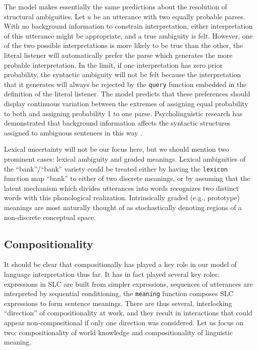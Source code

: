 \documentclass[pdfextras]{handbook}
\begin{document}
The model makes essentially the same predictions about the resolution of structural ambiguities. Let $u$ be an utterance with two equally probable parses.
With no background information to constrain interpretation, either interpretation of this utterance might be appropriate, and a true ambiguity is felt. 
However, one of the two possible interpretations is more likely to be true than the other, the literal listener will automatically prefer the parse which generates the more probable interpretation.
In the limit, if one interpretation has zero prior probability, the syntactic ambiguity will not be felt because the interpretation that it generates will always be rejected by the \lstinline{query} function embedded in the definition of the literal listener.
The model predicts that these preferences should display continuous variation between the extremes of assigning equal probability to both and assigning probability 1 to one parse.
Psycholinguistic research has demonstrated that background information affects the syntactic structures assigned to ambiguous sentences in this way \citep{crain1985not,altmann1988interaction,spivey2002eye}.

Lexical uncertainty will not be our focus here, but we should mention two prominent cases: lexical ambiguity and graded meanings. 
Lexical ambiguities of the ``bank''/``bank'' variety could be treated either by having the \lstinline{lexicon} function map ``bank'' to either of two discrete meanings, or by assuming that the latent mechanism which divides utterances into words recognizes two distinct words with this phonological realization.
Intrinsically graded (e.g., prototype) meanings are most naturally thought of as stochastically denoting regions of a non-discrete conceptual space. 


\subsection{Compositionality}

It should be clear that compositionally has played a key role in our model of language interpretation thus far. It has in fact played several key roles: expressions in SLC are built from simpler expressions, sequences of utterances are interpreted by sequential conditioning, the \lstinline{meaning} function composes SLC expressions to form sentence meanings. There are thus several, interlocking ``direction'' of compositionality at work, and they result in interactions that could appear non-compositional if only one direction was considered. Let us focus on two: compositionality of world knowledge and compositionality of linguistic meaning.
\end{document}
